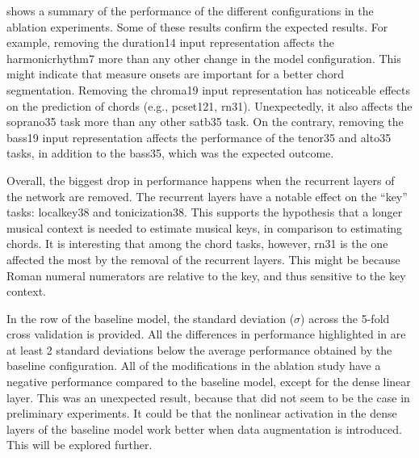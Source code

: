 

 shows a summary of the performance of the
different configurations in the ablation experiments. Some
of these results confirm the expected results. For example,
removing the \gls{duration14} input representation affects
the \gls{harmonicrhythm7} more than any other change in the
model configuration. This might indicate that measure onsets
are important for a better chord segmentation. Removing the
\gls{chroma19} input representation has noticeable effects
on the prediction of chords (e.g., \gls{pcset121},
\gls{rn31}). Unexpectedly, it also affects the
\gls{soprano35} task more than any other \gls{satb35} task.
On the contrary, removing the \gls{bass19} input
representation affects the performance of the \gls{tenor35}
and \gls{alto35} tasks, in addition to the \gls{bass35},
which was the expected outcome.

Overall, the biggest drop in performance happens when the
recurrent layers of the network are removed. The recurrent
layers have a notable effect on the ``key'' tasks:
\gls{localkey38} and \gls{tonicization38}. This supports the
hypothesis that a longer musical context is needed to
estimate musical keys, in comparison to estimating chords.
It is interesting that among the chord tasks, however,
\gls{rn31} is the one affected the most by the removal of
the recurrent layers. This might be because Roman numeral
numerators are relative to the key, and thus sensitive to
the key context.

In the row of the baseline model, the standard deviation
($\sigma$) across the 5-fold cross validation is provided.
All the differences in performance highlighted in
 are at least 2 standard deviations below
the average performance obtained by the baseline
configuration. All of the modifications in the ablation
study have a negative performance compared to the baseline
model, except for the dense linear layer. This was an
unexpected result, because that did not seem to be the case
in preliminary experiments. It could be that the nonlinear
activation in the dense layers of the baseline model work
better when data augmentation is introduced. This will be
explored further.
